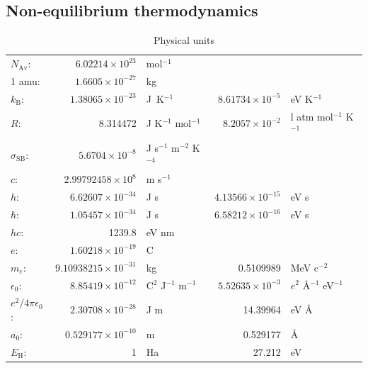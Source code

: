 \documentclass[11pt]{article}
\begin{document}
\subsection{Non-equilibrium thermodynamics}
\label{sec:orgd522628}
\begin{table}
\begin{center}
\caption{Physical units}
\begin{tabular}{|lrlrl|}
  \hline
  $N_\mathrm{Av}$: & $6.02214 \times 10^{23}$& mol$^{-1}$  & & \\
  1 amu: & $1.6605\times 10^{-27}$ & kg & & \\
  $k_\mathrm{B}$: & $1.38065\times 10^{-23}$ & J~K$^{-1}$ & $8.61734\times
  10^{-5}$ & eV K$^{-1}$\\
  $R$: & 8.314472 & J K$^{-1}$ mol$^{-1}$ & $8.2057 \times 10^{-2}$ & l atm mol$^{-1}$ K$^{-1}$\\
  $\sigma_\mathrm{SB}$: & $5.6704\times 10^{-8}$ & J s$^{-1}$ m$^{-2}$ K$^{-4}$ & & \\
  $c$: & $2.99792458\times 10^8$ & m s$^{-1}$ & & \\
  $h$: & $6.62607\times 10^{-34}$ & J s & $4.13566\times 10^{-15}$ & eV s
  \\
  $\hbar$: & $1.05457\times 10^{-34}$ & J s & $6.58212\times 10^{-16}$&  eV s \\
  $hc$: & 1239.8 & eV nm  & & \\
  $e$: & $1.60218\times 10^{-19}$ &  C & & \\
  $m_e:$ & $9.10938215\times 10^{-31}$ & kg &0.5109989 & MeV c$^{-2}$  \\
  $\epsilon_0$: & $8.85419 \times 10^{-12}$ & C$^2$ J$^{-1}$ m$^{-1}$ & $5.52635\times
  10^{-3}$ & $e^2$ \AA$^{-1}$ eV$^{-1}$ \\
  $e^2/4\pi\epsilon_0$: & $2.30708 \times 10^{-28}$&  J m & 14.39964 & eV \AA\\
  $a_0$: & $0.529177 \times 10^{-10}$ & m & 0.529177 & \AA\\
  $E_\mathrm{H} $: & 1 & Ha & 27.212 & eV \\
  \hline
\end{tabular}
\end{center}
\end{table}
\end{document}
